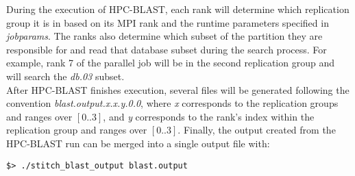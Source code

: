\documentclass[10pt]{article}
\begin{document}
\noindent During the execution of HPC-BLAST, each rank will determine which replication group it is in based on its MPI rank and the runtime parameters specified in \emph{job\textunderscore params}.  The ranks also determine which subset of the partition  they are responsible for and
read that database subset during the search process.  For example, rank 7 of the parallel job will be in the second replication group and will search the \emph{db.03} subset.\\

\noindent After HPC-BLAST finishes execution, several files will be generated following the convention \emph{blast.output.x.x.y.0.0}, where  \emph{x} corresponds to the replication groups and ranges over \([0..3]\), and \emph{y} corresponds to the rank's index within the replication group and ranges over \([0..3]\).
Finally, the output created from the HPC-BLAST run can be merged
into a single output file with:
\begin{verbatim}
$> ./stitch_blast_output blast.output
\end{verbatim}
\end{document}
